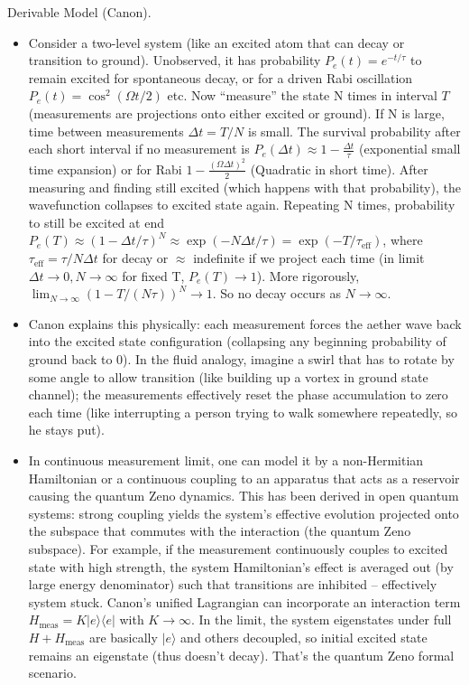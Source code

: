 \documentclass[11pt]{article}
\begin{document}
Derivable Model (Canon).


\begin{itemize}

\item 
Consider a two-level system (like an excited atom that can decay or transition to ground). Unobserved, it has probability $P_e(t) = e^{-t/\tau}$ to remain excited for spontaneous decay, or for a driven Rabi oscillation $P_e(t) = \cos^2(\Omega t/2)$ etc. Now “measure” the state N times in interval $T$ (measurements are projections onto either excited or ground). If N is large, time between measurements $\Delta t = T/N$ is small. The survival probability after each short interval if no measurement is $P_e(\Delta t) \approx 1 - \frac{\Delta t}{\tau}$ (exponential small time expansion) or for Rabi $1 - \frac{(\Omega \Delta t)^2}{2}$ (Quadratic in short time). After measuring and finding still excited (which happens with that probability), the wavefunction collapses to excited state again. Repeating N times, probability to still be excited at end $P_e(T) \approx (1 - \Delta t/\tau)^N \approx \exp(-N\Delta t/\tau) = \exp(-T/\tau_{\text{eff}})$, where $\tau_{\text{eff}} = \tau/N\Delta t$ for decay or $\approx$ indefinite if we project each time (in limit $\Delta t \to 0, N \to \infty$ for fixed T, $P_e(T)\to1$). More rigorously, $\lim_{N\to\infty}(1 - T/(N\tau))^N \to 1$. So no decay occurs as $N\to\infty$.




\item 
Canon explains this physically: each measurement forces the aether wave back into the excited state configuration (collapsing any beginning probability of ground back to 0). In the fluid analogy, imagine a swirl that has to rotate by some angle to allow transition (like building up a vortex in ground state channel); the measurements effectively reset the phase accumulation to zero each time (like interrupting a person trying to walk somewhere repeatedly, so he stays put).




\item 
In continuous measurement limit, one can model it by a non-Hermitian Hamiltonian or a continuous coupling to an apparatus that acts as a reservoir causing the quantum Zeno dynamics. This has been derived in open quantum systems: strong coupling yields the system’s effective evolution projected onto the subspace that commutes with the interaction (the quantum Zeno subspace). For example, if the measurement continuously couples to excited state with high strength, the system Hamiltonian’s effect is averaged out (by large energy denominator) such that transitions are inhibited – effectively system stuck. Canon’s unified Lagrangian can incorporate an interaction term $H_{\text{meas}} = K |e\rangle\langle e|$ with $K \to \infty$. In the limit, the system eigenstates under full $H + H_{\text{meas}}$ are basically $|e\rangle$ and others decoupled, so initial excited state remains an eigenstate (thus doesn’t decay). That’s the quantum Zeno formal scenario.





\end{itemize}
\end{document}
